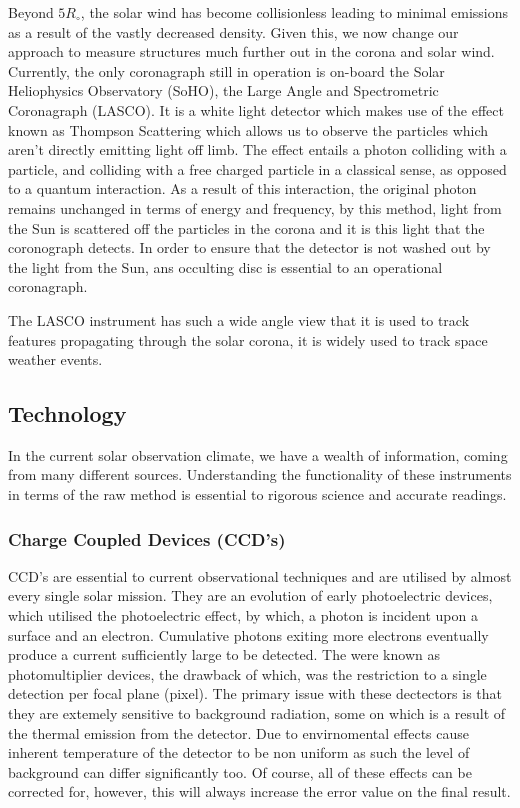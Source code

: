 Beyond $5 R_\circ$, the solar wind has become collisionless leading to minimal emissions as a result of the vastly decreased density.
Given this, we now change our approach to measure structures much further out in the corona and solar wind.
Currently, the only coronagraph still in operation is on-board the Solar Heliophysics Observatory (SoHO), the Large Angle and Spectrometric Coronagraph (LASCO). 
It is a white light detector which makes use of the effect known as Thompson Scattering which allows us to observe the particles which aren't directly emitting light off limb.
The effect entails a photon colliding with a particle, and colliding with a free charged particle in a classical sense, as opposed to a quantum interaction.
As a result of this interaction, the original photon remains unchanged in terms of energy and frequency, by this method, light from the Sun is scattered off the particles in the corona and it is this light that the coronograph detects.
In order to ensure that the detector is not washed out by the light from the Sun, ans occulting disc is essential to an operational coronagraph.

The LASCO instrument has such a wide angle view that it is used to track features propagating through the solar corona, it is widely used to track space weather events.




\subsection{Technology}

In the current solar observation climate, we have a wealth of information, coming from many different sources.
Understanding the functionality of these instruments in terms of the raw method is essential to rigorous science and accurate readings.

\subsubsection{Charge Coupled Devices (CCD's)}

CCD's are essential to current observational techniques and are utilised by almost every single solar mission.
They are an evolution of early photoelectric devices, which utilised the photoelectric effect, by which, a photon is incident upon a surface and an electron.
Cumulative photons exiting more electrons eventually produce a current sufficiently large to be detected.
The were known as photomultiplier devices, the drawback of which, was the restriction to a single detection per focal plane (pixel).
The primary issue with these dectectors is that they are extemely sensitive to background radiation, some on which is a result of the thermal emission from the detector.
Due to envirnomental effects cause inherent temperature of the detector to be non uniform as such the level of background can differ significantly too.
Of course, all of these effects can be corrected for, however, this will always increase the error value on the final result.

